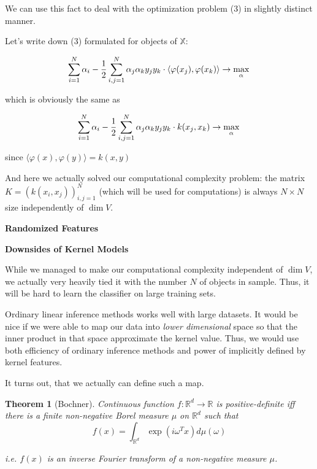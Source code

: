 \documentclass{article}
\theoremstyle{bfnote}
\newtheorem{thm}{Theorem}
\begin{document}
	
	We can use this fact to deal with the optimization problem (3) in slightly distinct manner.
	
	Let's write down (3) formulated for objects of $\mathbb{X}$:
	
	$$
	\sum_{i=1}^N {\alpha_i} - \frac{1}{2}\sum_{i,j=1}^N \alpha_j \alpha_k y_j y_k \cdot \langle \varphi(x_j), \varphi(x_k) \rangle
	\rightarrow \max\limits_{\alpha} \\
	$$
	
	which is obviously the same as
	
	$$
		\sum_{i=1}^N {\alpha_i} - \frac{1}{2}\sum_{i,j=1}^N \alpha_j \alpha_k y_j y_k 
	\cdot k(x_j, x_k)
	\rightarrow \max\limits_{\alpha} \\
	$$
	
	since $\langle \varphi(x), \varphi(y) \rangle = k(x, y)$
	
	And here we actually solved our computational complexity problem: the matrix $K=(k(x_i, x_j))_{i, j=1}^N$ (which will be used for computations) is always $N \times N$ size independently of $\dim V$.
	
	\newpage
	
	\begin{center}
		\textbf{\large Randomized Features}
	\end{center}
	
	\textbf{Downsides of Kernel Models}
	
	While we managed to make our computational complexity independent of $\dim V$, we actually very heavily tied it with the number $N$ of objects in sample. Thus, it will be hard to learn the classifier on large training sets.
	
	Ordinary linear inference methods works well with large datasets. It would be nice if we were able to map our data into \textit{lower dimensional} space so that the inner product in that space approximate the kernel value. Thus, we would use both efficiency of ordinary inference methods and power of implicitly defined by kernel features.
	
	It turns out, that we actually can define such a map.
	
	\begin{thm}[Bochner]
		Continuous function $f:\mathbb{R}^d \rightarrow \mathbb{R}$ is positive-definite iff there is a finite non-negative Borel
		measure $\mu$ on $\mathbb{R}^d$ such that
		$$
		f(x) =  \int_{\mathbb{R}^d} \exp(i \omega ^T x) d \mu(\omega)
		$$
		
		i.e. $f(x)$ is an inverse Fourier transform of a non-negative measure $\mu$.
	\end{thm}
\end{document}
